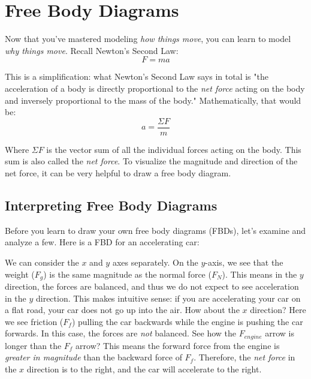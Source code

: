 \chapter{Free Body Diagrams}

Now that you've mastered modeling \textit{how things move}, you can learn to 
model \textit{why things move}. Recall Newton's Second Law:
$$F = ma$$

This is a simplification: what Newton's Second Law says in total is "the 
acceleration of a body is directly proportional to the \textit{net force} 
acting on the body and inversely proportional to the mass of the body." 
Mathematically, that would be:
$$a = \frac{\Sigma F}{m}$$

Where $\Sigma F$ is the vector sum of all the individual forces acting on the 
body. This sum is also called the \textit{net force}. To visualize the magnitude 
and direction of the net force, it can be very helpful to draw a free body 
diagram. 

\section{Interpreting Free Body Diagrams}
Before you learn to draw your own free body diagrams (FBDs), let's examine and 
analyze a few. Here is a FBD for an accelerating car:

\begin{center}
\end{center}

We can consider the $x$ and $y$ axes separately. On the $y$-axis, we see that 
the weight ($F_g$) is the same magnitude as the normal force ($F_N$). This 
means in the $y$ direction, the forces are balanced, and thus we do not expect 
to see acceleration in the $y$ direction. This makes intuitive sense: if you are 
accelerating your car on a flat road, your car does not go up into the air. How 
about the $x$ direction? Here we see friction ($F_f$) pulling the car backwards 
while the engine is pushing the car forwards. In this case, the forces are 
\textit{not} balanced. See how the $F_{engine}$ arrow is longer than the $F_f$ 
arrow? This means the forward force from the engine is \textit{greater in magnitude}
than the backward force of $F_f$. Therefore, the \textit{net force} in the $x$ 
direction is to the right, and the car will accelerate to the right. 

